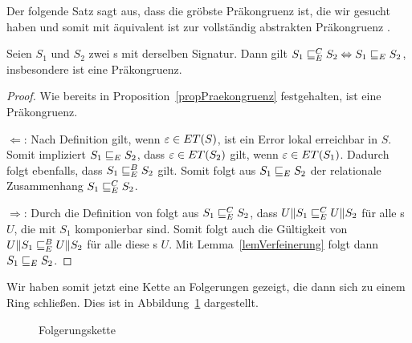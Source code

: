 Der folgende Satz sagt aus, dass \ERel{} die gröbste Präkongruenz ist, die wir
gesucht haben und somit mit äquivalent ist zur vollständig abstrakten
Präkongruenz \ECRel{}.

\begin{satz}
  \label{satzFullAbstractness}
  Seien $S_1$ und $S_2$ zwei \EIO{}s mit derselben Signatur. Dann gilt
  $S_1\sqsubseteq _E^C S_2\Leftrightarrow S_1\sqsubseteq _E S_2$, insbesondere ist \ERel{}
  eine Präkongruenz.
\end{satz}

\begin{proof}
  Wie bereits in Proposition~\ref{propPraekongruenz} festgehalten, ist \ERel{} eine
  Präkongruenz.

  \glqq $\Leftarrow$\grqq : Nach Definition gilt, wenn
      $\varepsilon\in ET{}(S)$, ist ein Error lokal erreichbar in $S$.
      Somit impliziert $S_1\sqsubseteq _E S_2$, dass $\varepsilon\in
      ET{}(S_2)$ gilt, wenn $\varepsilon\in ET{}(S_1)$. Dadurch folgt ebenfalls,
      dass $S_1\sqsubseteq _E^B S_2$ gilt. Somit folgt aus $S_1\sqsubseteq _E S_2$ der relationale
      Zusammenhang $S_1\sqsubseteq _E^C S_2$.

      \glqq $\Rightarrow$\grqq : Durch die Definition von \ECRel{} folgt aus
  $S_1\sqsubseteq _E^C S_2$, dass $U\|S_1\sqsubseteq _E^C U\|S_2$ für alle \EIO{}s $U$, die mit
  $S_1$ komponierbar sind. Somit folgt auch die Gültigkeit von
  $U\|S_1\sqsubseteq _E^B U\|S_2$ für alle diese \EIO{}s $U$. Mit
  Lemma~\ref{lemVerfeinerung} folgt dann $S_1\sqsubseteq _E S_2$.
\end{proof}

Wir haben somit jetzt eine Kette an Folgerungen gezeigt, die dann sich zu einem
Ring schließen. Dies ist in Abbildung~\ref{Folgerungskette} dargestellt.

\begin{figure}[h!tbp]
  \begin{center}
    \caption{Folgerungskette}
    \label{Folgerungskette}
  \end{center}
\end{figure}

